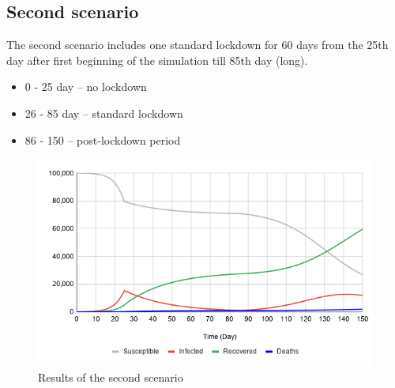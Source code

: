 \documentclass[12pt,a4paper,english]{article}
\begin{document}
    \subsection{Second scenario}
    \label{second_scenario}
    The second scenario includes one standard lockdown for 60 days from the 25th day after first beginning of the simulation till 85th day (long).
    \begin{itemize}
        \item 0 - 25 day -- no lockdown
        \item 26 - 85 day -- standard lockdown 
        \item 86 - 150 -- post-lockdown period
    \end{itemize}
    \begin{figure}[H]
        \centering
        \includegraphics[scale=0.45]{1large.png}
        \caption{Results of the second scenario}
    \end{figure}

    \newpage
\end{document}
